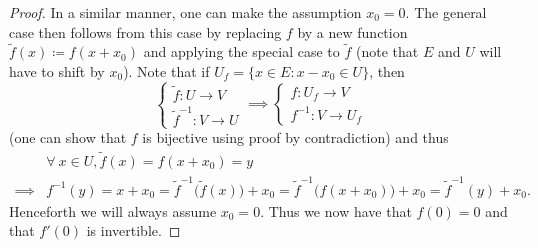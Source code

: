 \begin{proof}
    In a similar manner, one can make the assumption \(x_0 = 0\).
    The general case then follows from this case by replacing \(f\) by a new function
    \(\tilde{f}(x) \coloneqq f(x + x_0)\) and applying the special case to \(\tilde{f}\)
    (note that \(E\) and \(U\) will have to shift by \(x_0\)).
    Note that if \(U_f = \{x \in E : x - x_0 \in U\}\), then
    \[
        \begin{cases}
            \tilde{f} : U \to V \\
            \tilde{f}^{-1} : V \to U
        \end{cases} \implies \begin{cases}
            f : U_f \to V \\
            f^{-1} : V \to U_f
        \end{cases}
    \]
    (one can show that \(f\) is bijective using proof by contradiction)
    and thus
    \begin{align*}
                 & \forall\ x \in U, \tilde{f}(x) = f(x + x_0) = y                                                                                        \\
        \implies & f^{-1}(y) = x + x_0 = \tilde{f}^{-1}\big(\tilde{f}(x)\big) + x_0 = \tilde{f}^{-1}\big(f(x + x_0)\big) + x_0 = \tilde{f}^{-1}(y) + x_0.
    \end{align*}
    Henceforth we will always assume \(x_0 = 0\).
    Thus we now have that \(f(0) = 0\) and that \(f'(0)\) is invertible.


\end{proof}

